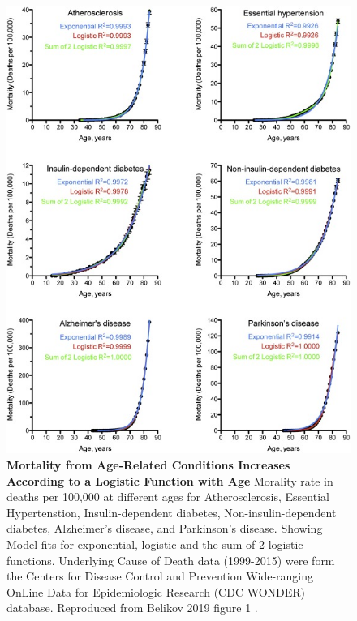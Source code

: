 \documentclass[
]{book}
\begin{document}
\begin{figure}

{\centering \includegraphics[width=0.8\linewidth]{figs/Belikov2019_fig1} 

}

\caption{\textbf{Mortality from Age-Related Conditions Increases According to a Logistic Function with Age} Morality rate in deaths per 100,000 at different ages for Atherosclerosis, Essential Hypertenstion, Insulin-dependent diabetes, Non-insulin-dependent diabetes, Alzheimer's disease, and Parkinson's disease. Showing Model fits for exponential, logistic and the sum of 2 logistic functions. Underlying Cause of Death data (1999-2015) were form the Centers for Disease Control and Prevention Wide-ranging OnLine Data for Epidemiologic Research (CDC WONDER) database. Reproduced from Belikov 2019 figure 1 \citep{Belikov2019}.}\label{fig:Belikov2019-fig1}
\end{figure}
\end{document}
